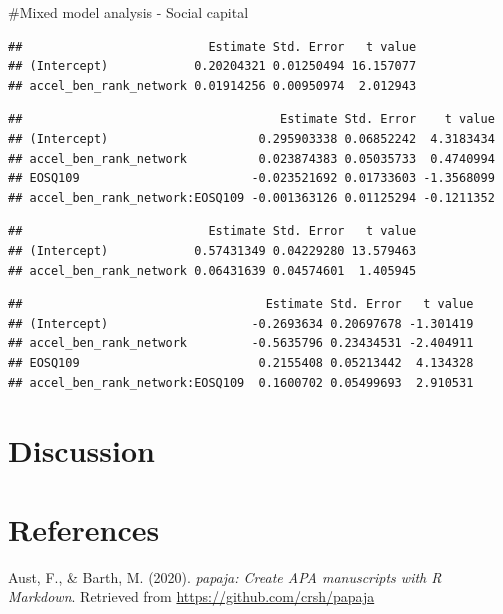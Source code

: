 \documentclass[
  english,
  man]{apa6}
\begin{document}
\#Mixed model analysis - Social capital

\begin{verbatim}
##                          Estimate Std. Error   t value
## (Intercept)            0.20204321 0.01250494 16.157077
## accel_ben_rank_network 0.01914256 0.00950974  2.012943
\end{verbatim}

\begin{verbatim}
##                                    Estimate Std. Error    t value
## (Intercept)                     0.295903338 0.06852242  4.3183434
## accel_ben_rank_network          0.023874383 0.05035733  0.4740994
## EOSQ109                        -0.023521692 0.01733603 -1.3568099
## accel_ben_rank_network:EOSQ109 -0.001363126 0.01125294 -0.1211352
\end{verbatim}

\begin{verbatim}
##                          Estimate Std. Error   t value
## (Intercept)            0.57431349 0.04229280 13.579463
## accel_ben_rank_network 0.06431639 0.04574601  1.405945
\end{verbatim}

\begin{verbatim}
##                                  Estimate Std. Error   t value
## (Intercept)                    -0.2693634 0.20697678 -1.301419
## accel_ben_rank_network         -0.5635796 0.23434531 -2.404911
## EOSQ109                         0.2155408 0.05213442  4.134328
## accel_ben_rank_network:EOSQ109  0.1600702 0.05499693  2.910531
\end{verbatim}

\hypertarget{discussion}{%
\section{Discussion}\label{discussion}}

\newpage

\hypertarget{references}{%
\section{References}\label{references}}

\begingroup
\setlength{\parindent}{-0.5in}
\setlength{\leftskip}{0.5in}

\hypertarget{refs}{}
\leavevmode\hypertarget{ref-R-papaja}{}%
Aust, F., \& Barth, M. (2020). \emph{papaja: Create APA manuscripts with R Markdown}. Retrieved from \url{https://github.com/crsh/papaja}
\end{document}
